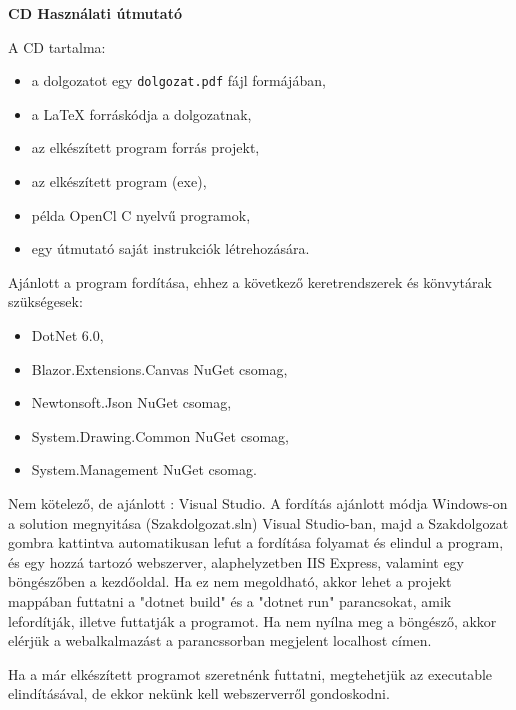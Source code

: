 \pagestyle{empty}

\noindent \textbf{\Large CD Használati útmutató}

\vskip 1cm

A CD tartalma:
\begin{itemize}
\item a dolgozatot egy \texttt{dolgozat.pdf} fájl formájában,
\item a LaTeX forráskódja a dolgozatnak,
\item az elkészített program forrás projekt,
\item az elkészített program (exe),
\item példa OpenCl C nyelvű programok,
\item egy útmutató saját instrukciók létrehozására.
\end{itemize}

Ajánlott a program fordítása, ehhez a következő keretrendszerek és könvytárak szükségesek: 
\begin{itemize}
\item DotNet 6.0,
\item Blazor.Extensions.Canvas NuGet csomag,
\item Newtonsoft.Json NuGet csomag,
\item System.Drawing.Common NuGet csomag,
\item System.Management  NuGet csomag.
\end{itemize}

Nem kötelező, de ajánlott : Visual Studio.
A fordítás ajánlott módja Windows-on a solution megnyitása (Szakdolgozat.sln) Visual Studio-ban, majd a Szakdolgozat gombra kattintva automatikusan lefut a fordítása folyamat és elindul a program, és egy hozzá tartozó webszerver, alaphelyzetben IIS Express, valamint egy böngészőben a kezdőoldal.
Ha ez nem megoldható, akkor lehet a projekt mappában futtatni a "dotnet build" és a "dotnet run" parancsokat, amik lefordítják, illetve futtatják a programot. Ha nem nyílna meg a böngésző, akkor elérjük a webalkalmazást a parancssorban megjelent localhost címen.

Ha a már elkészített programot szeretnénk futtatni, megtehetjük az executable elindításával, de ekkor nekünk kell webszerverről gondoskodni.

